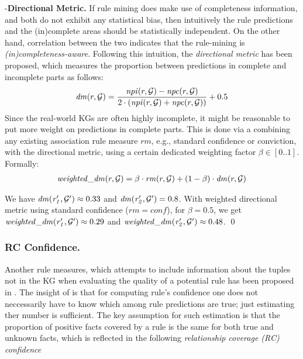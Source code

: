 \noindent -\textbf{Directional Metric.} If rule mining does make use of completeness information, and both do not exhibit any statistical bias, then intuitively the rule predictions and the (in)complete areas should be statistically independent. On the other hand, correlation between the two indicates that the rule-mining is \emph{(in)completeness-aware}. Following this intuition, the \emph{directional metric} has been proposed, which measures the proportion between predictions in complete and incomplete parts as follows:
\begin{align*}
\mathit{dm}(r,\mathcal{G}) = \frac{\mathit{npi}(r,\mathcal{G})-\mathit{npc}(r,\mathcal{G})}{2\cdot(\mathit{npi}(r,\mathcal{G})+\mathit{npc}(r,\mathcal{G}))}+0.5
\end{align*}
Since the real-world KGs are often highly incomplete, it might be reasonable to put more weight on predictions in complete parts. This is done via a %
combining any existing association rule measure $rm$, e.g., standard confidence or conviction, with 
the directional metric, using a certain dedicated weighting factor $\beta \in [0..1]$. Formally:
\begin{align*}
\mathit{weighted\_dm}(r,\mathcal{G})=\beta \cdot \mathit{rm}(r,\mathcal{G}) + (1-\beta) \cdot \mathit{dm}(r,\mathcal{G}) 
\end{align*}
\begin{example}
We have $\mathit{dm(r_1',\mathcal{G}')}\approx 0.33$ and $\mathit{dm(r_2',\mathcal{G}')}=0.8$. With weighted directional metric using standard confidence ($rm = conf$), for $\beta=0.5$, we get $\mathit{weighted\_dm(r_1',\mathcal{G}')} \approx 0.29$ and $\mathit{weighted\_dm(r_2',\mathcal{G}')} \approx 0.48$. \qed
\end{example}

\subsubsection{RC Confidence.} Another rule measures, which attempts to include information about the tuples not in the KG when evaluating the quality of a potential rule has been proposed in \cite{DBLP:conf/www/ZupancD18}. 
The insight of \cite{DBLP:conf/www/ZupancD18} is that for computing rule's confidence one does not neccessarily have to know which among rule predictions are true; just estimating ther number is sufficient. The key assumption for such estimation is that the proportion of positive facts covered by a rule is the same for both true and unknown facts, which is reflected in the following \emph{relationship coverage (RC) confidence}

